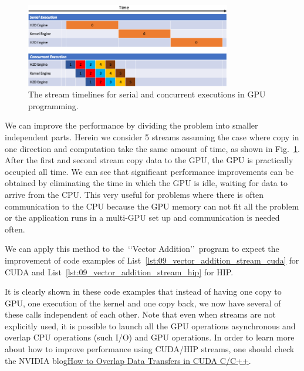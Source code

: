 \begin{figure}[htbp]
\centering\includegraphics[width=0.8\textwidth]{fig_problem/streams_timeline.png}
\caption{The stream timelines for serial and concurrent executions in GPU programming.}\label{fig:streams_timeline}
\end{figure}


\par
We can improve the performance by dividing the problem into smaller independent parts.
Herein we consider 5 streams assuming the case where copy in one direction and computation take the same amount of time, as shown in Fig.~\ref{fig:streams_timeline}.
After the first and second stream copy data to the GPU, the GPU is practically occupied all time.
We can see that significant performance improvements can be obtained by eliminating the time in which the GPU is idle, waiting for data to arrive from the CPU.
This very useful for problems where there is often communication to the CPU because the GPU memory can not fit all the problem or the application runs in a multi-GPU set up and communication is needed often.


\par
We can apply this method to the~\lq\lq Vector Addition\rq\rq~program to expect the improvement of code examples of List~\ref{lst:09_vector_addition_stream_cuda} for CUDA and List~\ref{lst:09_vector_addition_stream_hip} for HIP.







\par
It is clearly shown in these code examples that instead of having one copy to GPU, one execution of the kernel and one copy back, we now have several of these calls independent of each other.
Note that even when streams are not explicitly used, it is possible to launch all the GPU operations asynchronous and overlap CPU operations (such I/O) and GPU operations.
In order to learn more about how to improve performance using CUDA/HIP streams, one should check the NVIDIA blog\href{https://developer.nvidia.com/blog/how-overlap-data-transfers-cuda-cc/}{How to Overlap Data Transfers in CUDA C/C++}.


